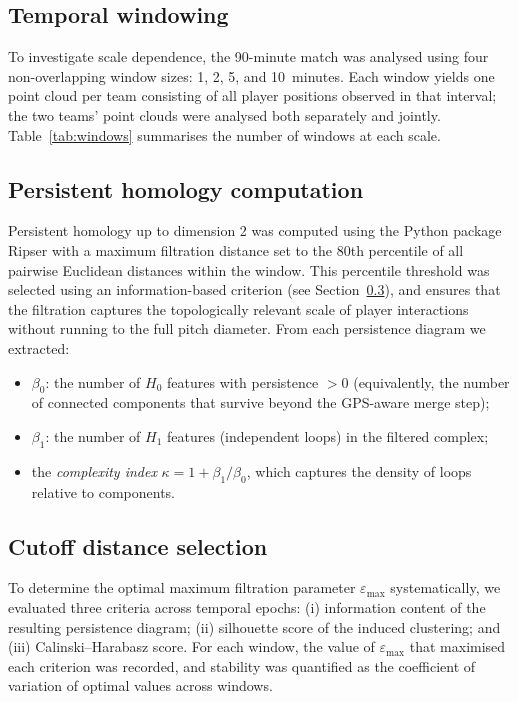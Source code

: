 \documentclass[11pt,a4paper]{article}
\begin{document}
\subsection{Temporal windowing}
\label{sec:windows}

To investigate scale dependence, the 90-minute match was
analysed using four non-overlapping window sizes: 1, 2, 5,
and 10~minutes.  Each window yields one point cloud per
team consisting of all player positions observed in that
interval; the two teams' point clouds were analysed both
separately and jointly.  Table~\ref{tab:windows} summarises
the number of windows at each scale.

\subsection{Persistent homology computation}
\label{sec:computation}

Persistent homology up to dimension 2 was computed using the
Python package Ripser \citep{Bauer2021,Tralie2018} with a maximum
filtration distance set to the 80th percentile of all
pairwise Euclidean distances within the window.  This
percentile threshold was selected using an information-based
criterion (see Section~\ref{sec:cutoff}), and ensures that
the filtration captures the topologically relevant scale of
player interactions without running to the full pitch
diameter.  From each persistence diagram we extracted:

\begin{itemize}
  \item \(\beta_0\): the number of \(H_0\) features with
        persistence \(> 0\) (equivalently, the number of
        connected components that survive beyond the
        GPS-aware merge step);
  \item \(\beta_1\): the number of \(H_1\) features
        (independent loops) in the filtered complex;
  \item the \emph{complexity index}
        \(\kappa = 1 + \beta_1 / \beta_0\), which captures
        the density of loops relative to components.
\end{itemize}

\subsection{Cutoff distance selection}
\label{sec:cutoff}

To determine the optimal maximum filtration parameter
\(\varepsilon_{\max}\) systematically, we evaluated three
criteria across temporal epochs: (i) information content of
the resulting persistence diagram; (ii) silhouette score of
the induced clustering; and (iii) Calinski--Harabasz score.
For each window, the value of \(\varepsilon_{\max}\) that
maximised each criterion was recorded, and stability was
quantified as the coefficient of variation of optimal values
across windows.
\end{document}
